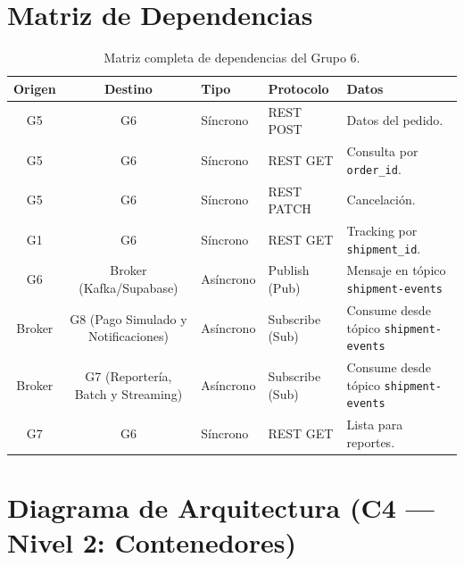 \documentclass[11pt, a4paper]{article}
\begin{document}
\section{Matriz de Dependencias}

\begin{table}[h!]
\centering
\renewcommand{\arraystretch}{1.5}
\begin{tabularx}{\textwidth}{c c l l X}
  \toprule
  \textbf{Origen} & \textbf{Destino} & \textbf{Tipo} & \textbf{Protocolo} & \textbf{Datos} \\
  \midrule
  G5  & G6  & Síncrono  & REST POST    & Datos del pedido. \\
  G5  & G6  & Síncrono  & REST GET     & Consulta por \texttt{order\_id}. \\
  G5  & G6  & Síncrono  & REST PATCH   & Cancelación. \\
  G1  & G6  & Síncrono  & REST GET     & Tracking por \texttt{shipment\_id}. \\
  G6     & Broker (Kafka/Supabase) & Asíncrono & Publish (Pub)   & Mensaje en tópico \texttt{shipment-events} \\
  Broker & G8 (Pago Simulado y Notificaciones)     & Asíncrono & Subscribe (Sub) & Consume desde tópico \texttt{shipment-events} \\
  Broker & G7 (Reportería, Batch y Streaming)        & Asíncrono & Subscribe (Sub) & Consume desde tópico \texttt{shipment-events} \\
  G7 & G6  & Síncrono  & REST GET     & Lista para reportes. \\
  \bottomrule
\end{tabularx}
\caption{Matriz completa de dependencias del Grupo 6.}
\end{table}


\section{Diagrama de Arquitectura (C4 --- Nivel 2: Contenedores)}
\end{document}
